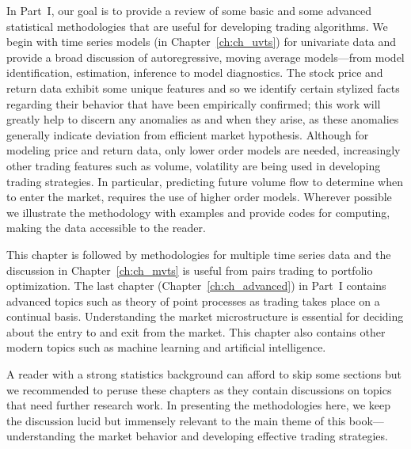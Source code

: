 
In Part~I, our goal is to provide a review of some basic and some advanced statistical methodologies that are useful for developing trading algorithms. We begin with time series models (in Chapter~\ref{ch:ch_uvts}) for univariate data and provide a broad discussion of autoregressive, moving average models---from model identification, estimation, inference to model diagnostics. The stock price and return data exhibit some unique features and so we identify certain stylized facts regarding their behavior that have been empirically confirmed; this work will greatly help to discern any anomalies as and when they arise, as these anomalies generally indicate deviation from efficient market hypothesis. Although for modeling price and return data, only lower order models are needed, increasingly other trading features such as volume, volatility are being used in developing trading strategies. In particular,  predicting future volume flow to determine when to enter the market, requires the use of higher order models. Wherever possible we illustrate the methodology with examples and provide codes for computing, making the data accessible to the reader. 


This chapter is followed by methodologies for multiple time series data and the discussion in Chapter~\ref{ch:ch_mvts} is useful from pairs trading to portfolio optimization. The last chapter (Chapter~\ref{ch:ch_advanced}) in Part~I contains advanced topics such as theory of point processes as trading takes place on a continual basis. Understanding the market microstructure is essential for deciding about the entry to and exit from the market. This chapter also contains other modern topics such as machine learning and artificial intelligence. 


A reader with a strong statistics background can afford to skip some sections but we recommended to peruse these chapters as they contain discussions on topics that need further research work. In presenting the methodologies here, we keep the discussion lucid but immensely relevant to the main theme of this book---understanding the market behavior and developing effective trading strategies. 